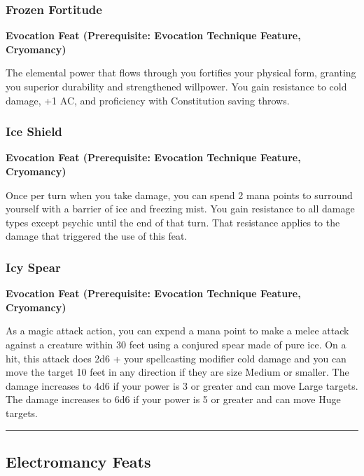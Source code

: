 \documentclass[12pt,letterpaper,twocolumn,openany,nodeprecatedcode,bg=none]{dndbook}
\begin{document}
\subsubsection{Frozen Fortitude}\label{frozen-fortitude}

\textbf{Evocation Feat (Prerequisite: Evocation Technique Feature,
Cryomancy)}

The elemental power that flows through you fortifies your physical form,
granting you superior durability and strengthened willpower. You gain
resistance to cold damage, +1 AC, and proficiency with Constitution
saving throws.

\subsubsection{Ice Shield}\label{ice-shield}

\textbf{Evocation Feat (Prerequisite: Evocation Technique Feature,
Cryomancy)}

Once per turn when you take damage, you can spend 2 mana points to
surround yourself with a barrier of ice and freezing mist. You gain
resistance to all damage types except psychic until the end of that
turn. That resistance applies to the damage that triggered the use of
this feat.

\subsubsection{Icy Spear}\label{icy-spear}

\textbf{Evocation Feat (Prerequisite: Evocation Technique Feature,
Cryomancy)}

As a magic attack action, you can expend a mana point to make a melee
attack against a creature within 30 feet using a conjured spear made of
pure ice. On a hit, this attack does 2d6 + your spellcasting modifier
cold damage and you can move the target 10 feet in any direction if they
are size Medium or smaller. The damage increases to 4d6 if your power is
3 or greater and can move Large targets. The damage increases to 6d6 if
your power is 5 or greater and can move Huge targets.

\begin{center}\rule{0.5\linewidth}{0.5pt}\end{center}

\subsection{Electromancy Feats}\label{electromancy-feats}
\end{document}
